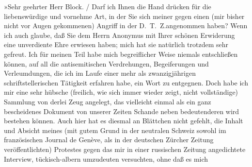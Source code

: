 {{{                        »Sehr geehrter Herr Block.{ / }Darf ich Ihnen die Hand drücken für die liebenswürdige und vornehme Art, in
                        der Sie sich meiner gegen einen (mir bisher nicht vor Augen gekommenen) Angriff in der D. T. Z.angenommen haben?
                        Wenn ich auch glaube, daß Sie dem Herrn Anonymus mit Ihrer schönen
                        Erwiderung eine unverdiente Ehre erwiesen haben; mich hat sie natürlich
                        trotzdem sehr gefreut. Ich für meinen Teil habe mich begreiflicher Weise
                        niemals entschließen können, auf all die antisemitischen Verdrehungen,
                        Begeiferungen und Verleumdungen, die ich im Laufe einer mehr als
                        zwanzigjährigen schriftstellerischen Tätigkeit erfahren habe, ein Wort zu
                        entgegnen. Doch habe ich mir eine sehr hübsche (freilich, wie sich immer
                        wieder zeigt, nicht vollständige) Sammlung von derlei Zeug angelegt, das
                        vielleicht einmal als ein ganz bescheidenes Dokument von unserer Zeiten
                        Schande neben bedeutenderen wird bestehen können. Auch hier hat es diesmal
                        an Blättchen nicht gefehlt, die Inhalt und Absicht meines (mit gutem Grund
                        in der neutralen Schweiz sowohl im
                        französischen Journal de Genève, als in der
                        deutschen Zürcher Zeitung veröffentlichten) Protestes gegen das mir in
                        einer russischen Zeitung angedichtete Interview, tückisch-albern umzudeuten versuchten, ohne daß es mich
}}}
